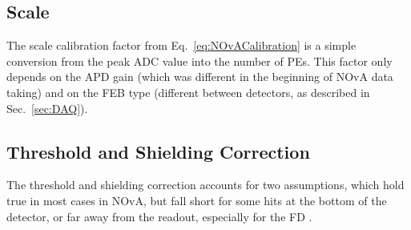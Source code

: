 
\subsection{Scale}
The scale calibration factor from Eq.~\ref{eq:NOvACalibration} is a simple conversion from the peak \gls{ADC} value into the number of \glspl{PE}. This factor only depends on the \gls{APD} gain (which was different in the beginning of \gls{NOvA} data taking) and on the \gls{FEB} type (different between detectors, as described in Sec.~\ref{sec:DAQ}).

\subsection{Threshold and Shielding Correction}\label{sec:NOvACalibTSCorr}
The threshold and shielding correction accounts for two assumptions, which hold true in most cases in \gls{NOvA}, but fall short for some hits at the bottom of the detector, or far away from the readout, especially for the \gls{FD} \cite{PrabhjotNOvAThesis_CalibrationAndOscResults2019.pdf}.


